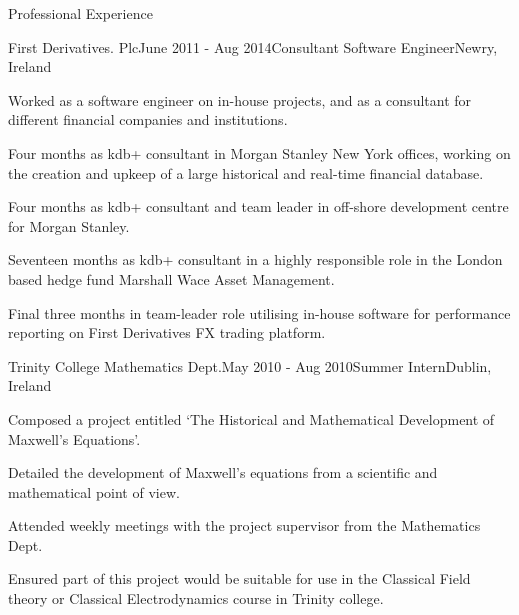 \documentclass{resume} %
\begin{document}
\begin{rSection}{Professional Experience}
  \begin{rSubsection}{First Derivatives. Plc}{June 2011 - Aug 2014}{Consultant Software Engineer}{Newry, Ireland}
    \item Worked as a software engineer on in-house projects, and as a consultant for different financial companies and institutions.
    \item Four months as kdb+ consultant in Morgan Stanley New York offices, working on the creation and upkeep of a large historical and real-time financial database.
    \item Four months as kdb+ consultant and team leader in off-shore development centre for Morgan Stanley.
    \item Seventeen months as kdb+ consultant in a highly responsible role in the London based hedge fund Marshall Wace Asset Management.
    \item Final three months in team-leader role utilising in-house software for performance reporting on First Derivatives FX trading platform.
  \end{rSubsection}


\begin{rSubsection}{Trinity College Mathematics Dept.}{May 2010 - Aug 2010}{Summer Intern}{Dublin, Ireland}
\item Composed a project entitled `The Historical and Mathematical Development of Maxwell's Equations'.
\item Detailed the development of Maxwell's equations from a scientific and mathematical point of view.
\item Attended weekly meetings with the project supervisor from the Mathematics Dept.
\item Ensured part of this project would be suitable for use in the Classical Field theory or Classical Electrodynamics course in Trinity college.

\end{rSubsection}



\end{rSection}
\end{document}
